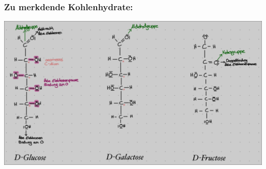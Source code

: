 \subsubsection{Zu merkdende Kohlenhydrate:}
\includegraphics[scale=0.31]{media/naturstoffe/stoffe.png}
